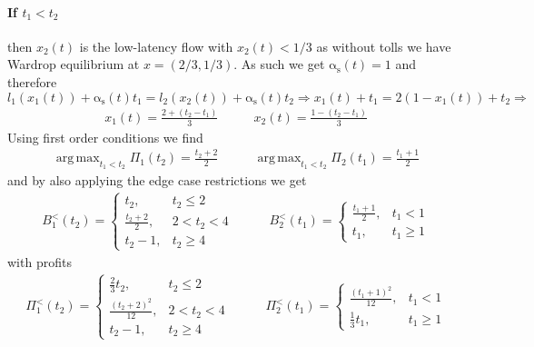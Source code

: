 \documentclass[a4paper,11pt]{article}
\newcommand{\as}{\mathrm{\alpha_s}}
\DeclareMathOperator*{\argmax}{arg\,max}
\begin{document}
\paragraph{If $t_1 < t_2$} then $x_2(t)$ is the low-latency flow with $x_2(t) < 1/3$ as without tolls we have Wardrop equilibrium at $x = (2/3, 1/3)$.
As such we get $\as(t) = 1$ and therefore
\[
	l_1(x_1(t)) + \as(t) t_1 = l_2(x_2(t)) + \as(t) t_2 \Rightarrow	x_1(t) + t_1 = 2 (1 - x_1(t)) + t_2 \Rightarrow
\]
\begin{equation*}
	\begin{aligned}
		x_1(t) = \frac{2 + (t_2 - t_1)}3
	\end{aligned}
	\qquad
	\begin{aligned}
		x_2(t) = \frac{1 - (t_2 - t_1)}3
	\end{aligned}
\end{equation*}
Using first order conditions we find
\begin{equation*}
	\begin{aligned}
		\argmax_{t_1 < t_2}\Pi_1(t_2) = \frac{t_2 + 2}2
	\end{aligned}
	\qquad
	\begin{aligned}
		\argmax_{t_1 < t_2}\Pi_2(t_1) = \frac{t_1 + 1}2
	\end{aligned}
\end{equation*}
and by also applying the edge case restrictions we get
\begin{equation*}
	\begin{aligned}
		B_1^<(t_2) =
		\begin{cases}
			t_2, & t_2 \le 2 \\
			\frac{t_2 + 2}2, & 2 < t_2 < 4 \\
			t_2 - 1, & t_2 \ge 4
		\end{cases}
	\end{aligned}
	\qquad
	\begin{aligned}
		B_2^<(t_1) =
		\begin{cases}
			\frac{t_1 + 1}2, & t_1 < 1 \\
			t_1, & t_1 \ge 1
		\end{cases}
	\end{aligned}
\end{equation*}
with profits
\begin{equation*}
	\begin{aligned}
		\Pi_1^<(t_2) =
		\begin{cases}
			\frac23 t_2, & t_2 \le 2 \\
			\frac{(t_2 + 2)^2}{12}, & 2 < t_2 < 4 \\
			t_2 - 1, & t_2 \ge 4
		\end{cases}
	\end{aligned}
	\qquad
	\begin{aligned}
		\Pi_2^<(t_1) =
		\begin{cases}
			\frac{(t_1 + 1)^2}{12}, & t_1 < 1 \\
			\frac13 t_1, & t_1 \ge 1
		\end{cases}
	\end{aligned}
\end{equation*}
\end{document}
